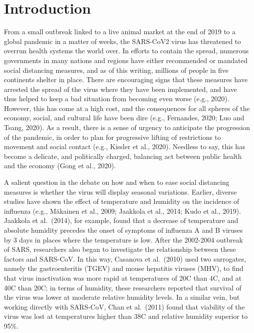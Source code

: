 \documentclass[]{elsarticle} %
\begin{document}
\begin{frontmatter}
 \end{frontmatter}

\hypertarget{introduction}{%
\section{Introduction}\label{introduction}}

From a small outbreak linked to a live animal market at the end of 2019
to a global pandemic in a matter of weeks, the SARS-CoV2 virus has
threatened to overrun health systems the world over. In efforts to
contain the spread, numerous governments in many nations and regions
have either recommended or mandated social distancing measures, and as
of this writing, millions of people in five continents shelter in place.
There are encouraging signs that these measures have arrested the spread
of the virus where they have been implemented, and have thus helped to
keep a bad situation from becoming even worse (e.g., 2020). However,
this has come at a high cost, and the consequences for all spheres of
the economy, social, and cultural life have been dire (e.g., Fernandes,
2020; Luo and Tsang, 2020). As a result, there is a sense of urgency to
anticipate the progression of the pandemic, in order to plan for
progressive lifting of restrictions to movement and social contact
(e.g., Kissler et al., 2020). Needless to say, this has become a
delicate, and politically charged, balancing act between public health
and the economy (Gong et al., 2020).

A salient question in the debate on how and when to ease social
distancing measures is whether the virus will display seasonal
variations. Earlier, diverse studies have shown the effect of
temperature and humidity on the incidence of influenza (e.g., Mäkainen
et al., 2009; Jaakkola et al., 2014; Kudo et al., 2019). Jaakkola et
al.~(2014), for example, found that a decrease of temperature and
absolute humidity precedes the onset of symptoms of influenza A and B
viruses by 3 days in places where the temperature is low. After the
2002-2004 outbreak of SARS, researchers also began to investigate the
relationship between these factors and SARS-CoV. In this way, Casanova
et al.~(2010) used two surrogates, namely the gastroenteritis (TGEV) and
mouse hepatitis viruses (MHV), to find that virus inactivation was more
rapid at temperatures of 20C than 4C, and at 40C than 20C; in terms of
humidity, these researchers reported that survival of the virus was
lower at moderate relative humidity levels. In a similar vein, but
working directly with SARS-CoV, Chan et al.~(2011) found that viability
of the virus was lost at temperatures higher than 38C and relative
humidity superior to 95\%.
\end{document}
